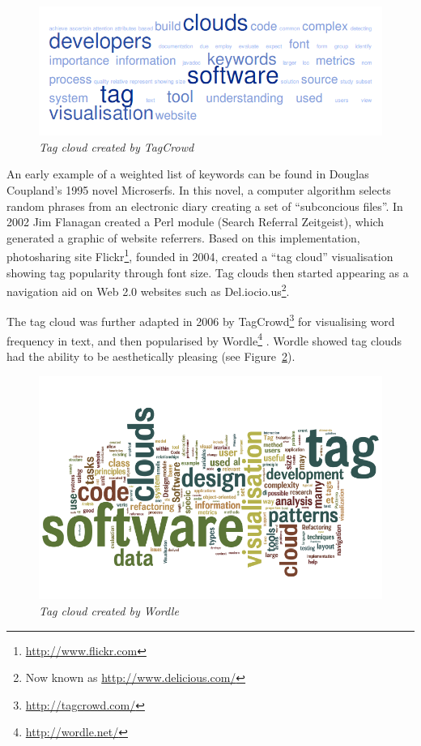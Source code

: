 \begin{figure}[htb]
   \centering
   \includegraphics[width=140mm]{tagcrowd.png}
  \caption{\emph{Tag cloud created by TagCrowd}}
  \label{fig:tagcrowd}
\end{figure}

An early example of a weighted list of keywords can be found in Douglas Coupland's 1995 novel Microserfs. In this novel, a computer algorithm selects random phrases from an electronic diary creating a set of ``subconcious files''. In 2002 Jim Flanagan created a Perl module (Search Referral Zeitgeist), which generated a graphic of website referrers. Based on this implementation, photosharing site Flickr\footnote{\url{http://www.flickr.com}}, founded in 2004, created a ``tag cloud'' visualisation showing tag popularity through font size. Tag clouds then started appearing as a navigation aid on Web 2.0 websites such as Del.iocio.us\footnote{Now known as \url{http://www.delicious.com/}}.

The tag cloud was further adapted in 2006 by TagCrowd\footnote{\url{http://tagcrowd.com/}} for visualising word frequency in text, and then popularised by Wordle\footnote{\url{http://wordle.net/}} \citep{feinberg10}. Wordle showed tag clouds had the ability to be aesthetically pleasing (see Figure~\ref{fig:wordle}).

\begin{figure}[!htb]
   	\centering
   	\includegraphics[width=140mm]{thesistagcloud.png}
  	\caption{\emph{Tag cloud created by Wordle}}
	\label{fig:wordle}	
\end{figure}

